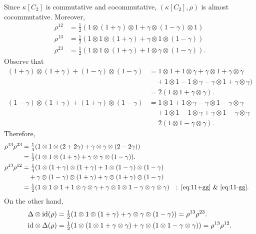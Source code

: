 \begin{xmpl}
    Since $\kappa[C_2]$ is commutative and cocommutative, $(\kappa[C_2],\rho)$ is almost cocommutative. Moreover,
    \begin{align*}
        \rho^{12} &= \tfrac12(1\otimes(1+\gamma)\otimes1
            +\gamma\otimes(1-\gamma)\otimes1)\\
        \rho^{13} &= \tfrac12(1\otimes1\otimes(1+\gamma)
            +\gamma\otimes1\otimes(1-\gamma))\\
        \rho^{23} &= \tfrac12(1\otimes1\otimes(1+\gamma)
            +1\otimes\gamma\otimes(1-\gamma)).
    \end{align*}
    Observe that
    \begin{align}
        (1+\gamma)\otimes(1+\gamma)+(1-\gamma)\otimes(1-\gamma)
            &=
            1\otimes1+1\otimes\gamma+\gamma\otimes1+\gamma\otimes\gamma
                \nonumber\\
            &\quad+ 1\otimes1-1\otimes\gamma-
            \gamma\otimes1+\gamma\otimes\gamma)\nonumber\\
            &= 2(1\otimes1+\gamma\otimes\gamma)\label{eq:11+gg}.\\
        (1-\gamma)\otimes(1+\gamma)+(1+\gamma)\otimes(1-\gamma)
            &= 1\otimes1+1\otimes\gamma-\gamma\otimes1
                -\gamma\otimes\gamma\nonumber\\
            &\quad+ 1\otimes1-1\otimes\gamma+\gamma\otimes1
                -\gamma\otimes\gamma\nonumber\\
            &= 2(1\otimes1-\gamma\otimes\gamma)\label{eq:11-gg}.
    \end{align}
    Therefore,
    \begin{align*}
        \rho^{13}\rho^{23} &=
            \tfrac14(1\otimes1\otimes(2+2\gamma)
            +\gamma\otimes\gamma\otimes(2-2\gamma))\\
            &=\tfrac12(1\otimes1\otimes(1+\gamma)
                +\gamma\otimes\gamma\otimes(1-\gamma)).\\
        \rho^{13}\rho^{12} &=
            \tfrac14(1\otimes(1+\gamma)\otimes(1+\gamma)
            + 1\otimes(1-\gamma)\otimes(1-\gamma)\\
            &\quad +\gamma\otimes(1-\gamma)\otimes(1+\gamma)
            +\gamma\otimes(1+\gamma)\otimes(1-\gamma)\\
            &= \tfrac12(1\otimes1\otimes1+1\otimes\gamma\otimes\gamma
            +\gamma\otimes1\otimes1-\gamma\otimes\gamma\otimes\gamma)
                &&;\ \eqref{eq:11+gg}\text{ \& }\eqref{eq:11-gg}.
    \end{align*}
    On the other hand,
    \begin{align*}
        \Delta\otimes\text{\rm id}(\rho) &=
            \tfrac12(1\otimes1\otimes(1+\gamma)
            +\gamma\otimes\gamma\otimes(1-\gamma))
            = \rho^{13}\rho^{23}.\\
        \text{\rm id}\otimes\Delta(\rho) &=
            \tfrac12(1\otimes(1\otimes1+\gamma\otimes\gamma)
            +\gamma\otimes(1\otimes1-\gamma\otimes\gamma))
            = \rho^{13}\rho^{12}.
    \end{align*}
\end{xmpl}

